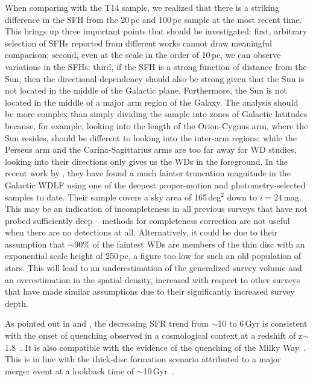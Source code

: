 \documentclass[fleqn,usenatbib]{mnras}
\begin{document}
When comparing with the T14 sample, we realized that there is a striking 
difference in the SFH from the 20\,pc and 100\,pc sample at the most recent
time. This brings up three important points that should be investigated: first,
arbitrary selection of SFHs reported from different works cannot draw
meaningful comparison; second, even at the scale in the order of 10\,pc, we
can observe variations in the SFHs; third, if the SFH is a strong function of
distance from the Sun, then the directional dependency should also be strong
given that the Sun is not located in the middle of the Galactic plane.
Furthermore, the Sun is not located in the middle of a major arm region of the
Galaxy. The analysis should be more complex than simply dividing the sample into
zones of Galactic latitudes because, for example, looking into the length of the
Orion-Cygnus arm, where the Sun resides, should be different to looking into the
inter-arm regions; while the Perseus arm and the Carina-Sagittarius arms are too far
away for WD studies, looking into their directions only gives us the WDs in the
foreground. In the recent work by \citet{2024MNRAS.535.3611Q}, they have
found a much fainter truncation magnitude in the Galactic WDLF using one of the
deepest proper-motion and photometry-selected samples to date. Their sample
covers a sky area of 165\,deg$^2$ down to $i=24$\,mag. This may be an indication
of incompleteness in all previous surveys that have not probed sufficiently
deep -- methods for completeness correction are not useful when there are
no detections at all. Alternatively, it could be due to their assumption that $\sim90$\% of the faintest WDs are members of the thin disc with an exponential scale height of 250\,pc, a figure too low for such an old population of stars. This will lead to an underestimation of the generalized survey volume and an overestimation in the spatial density, increased with respect to other surveys that have made similar assumptions due to their significantly increased survey depth.

As pointed out in \citet{2019A&A...624L...1M} and \citet{2019ApJ...878L..11I},
the decreasing SFR trend from $\sim$10 to 6\,Gyr is consistent with the
onset of quenching observed in a cosmological context at a redshift of
z$\sim$1.8~\citep[corresponds to a lookback time of
$\sim$10\,Gyr, e.g.][]{2016MNRAS.461.1100R, 2017MNRAS.471.4155K}. It is
also compatible with the evidence of the quenching of the Milky
Way~\citep{2016A&A...589A..66H}. This is in line with the thick-disc formation
scenario attributed to a major merger event at a lookback time of 
$\sim$10\,Gyr~\citep{2018Natur.563...85H}.
\end{document}
